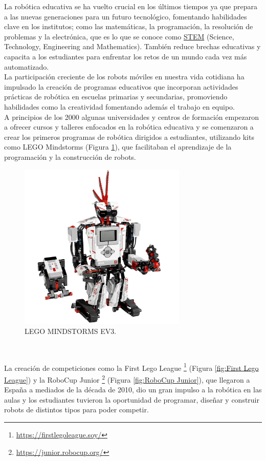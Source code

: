 La robótica educativa se ha vuelto crucial en los últimos tiempos ya que prepara a las nuevas generaciones para un futuro tecnológico, fomentando habilidades clave en los institutos; como las matemáticas, la programación, la resolución de problemas y la electrónica, que es lo que se conoce como \hyperlink{STEM}{STEM} (Science, Technology, Engineering and Mathematics). También reduce brechas educativas y capacita a los estudiantes para enfrentar los retos de un mundo cada vez más automatizado.\\

La participación creciente de los robots móviles en nuestra vida cotidiana ha impulsado la creación de programas educativos que incorporan actividades prácticas de robótica en escuelas primarias y secundarias, promoviendo habilidades como la creatividad fomentando además el trabajo en equipo.\\


A principios de los 2000 algunas universidades y centros de formación empezaron a ofrecer cursos y talleres enfocados en la robótica educativa y se comenzaron a crear los primeros programas de robótica dirigidos a estudiantes, utilizando kits como LEGO Mindstorms (Figura \ref{fig:lego}), que facilitaban el aprendizaje de la programación y la construcción de robots.

\begin{figure} [h!]
  \begin{center}
    \includegraphics[width=8cm]{figs/lego}
  \end{center}
  \caption{LEGO MINDSTORMS EV3.}
  \label{fig:lego}
\end{figure}\



La creación de competiciones como la First Lego League \footnote{\url{https://firstlegoleague.soy/}} (Figura \ref{fig:First Lego League}) y la RoboCup Junior \footnote{\url{https://junior.robocup.org/}} (Figura \ref{fig:RoboCup Junior}), que llegaron a España a mediados de la década de 2010, dio un gran impulso a la robótica en las aulas y los estudiantes tuvieron la oportunidad de programar, diseñar y construir robots de distintos tipos para poder competir.




